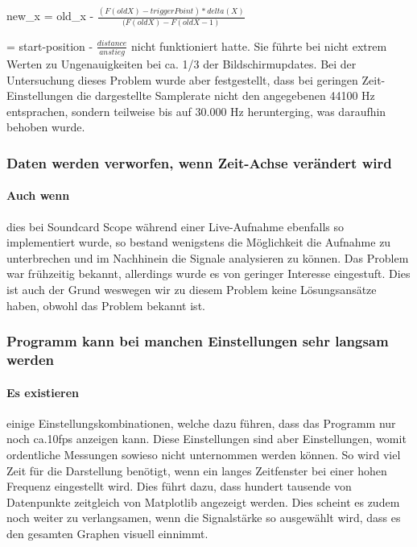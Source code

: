 \documentclass{article}
\begin{document}
new_x = old_x -  $\displaystyle\frac{(F(old X) - triggerPoint) * delta(X)}{(F(old X) - F(old X - 1)}$

\vspace{0.5cm}
= start-position -  $\displaystyle\frac{distance}{anstieg}$
\vspace{0.5cm}
 \newline
nicht funktioniert hatte. Sie führte bei nicht extrem Werten zu Ungenauigkeiten bei ca. 1/3 der Bildschirmupdates. Bei der Untersuchung dieses Problem wurde aber festgestellt, dass bei geringen Zeit-Einstellungen die dargestellte Samplerate nicht den angegebenen 44100 Hz entsprachen, sondern teilweise bis auf 30.000 Hz herunterging, was daraufhin behoben wurde.

\subsubsection{Daten werden verworfen, wenn Zeit-Achse verändert wird}
\paragraph{Auch wenn}
dies bei Soundcard Scope \cite{soundcard}  während einer Live-Aufnahme ebenfalls so implementiert wurde, so bestand wenigstens die Möglichkeit die Aufnahme zu unterbrechen und im Nachhinein die Signale analysieren zu können. Das Problem war frühzeitig bekannt, allerdings wurde es von geringer Interesse eingestuft. Dies ist auch der Grund weswegen wir zu diesem Problem keine Lösungsansätze haben, obwohl das Problem bekannt ist.


\subsubsection{Programm kann bei manchen Einstellungen sehr langsam werden}
\paragraph{Es existieren}
einige Einstellungskombinationen, welche dazu führen, dass das Programm nur noch ca.10fps anzeigen kann. Diese Einstellungen sind aber Einstellungen, womit ordentliche Messungen sowieso nicht unternommen werden können. So wird viel Zeit für die Darstellung benötigt, wenn ein langes Zeitfenster bei einer hohen Frequenz eingestellt wird. Dies führt dazu, dass hundert tausende von Datenpunkte zeitgleich von Matplotlib angezeigt werden. Dies scheint es zudem noch weiter zu verlangsamen, wenn die Signalstärke so ausgewählt wird, dass es den gesamten Graphen visuell einnimmt.
\end{document}
